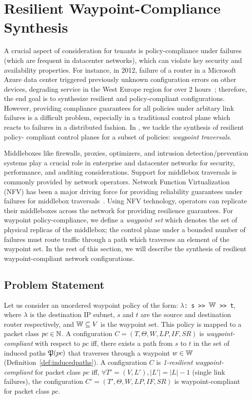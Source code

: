 \section{Resilient Waypoint-Compliance Synthesis}
A crucial aspect of consideration for tenants is 
policy-compliance under failures (which are frequent in 
datacenter networks), which can violate key security
and availability properties. 
For instance, in 2012,
failure of a router in a Microsoft Azure data center 
triggered previously unknown configuration errors on other 
devices, degrading service 
in the West Europe region for over 2
hours~\cite{azure}; therefore, the end goal is 
to synthesize resilient and policy-compliant 
configurations. 
However, providing compliance 
guarantees for all policies
under arbitary link failures is a difficult problem, 
especially in a traditional control plane 
which reacts to failures in a distributed fashion. 
In \name, we tackle the synthesis of resilient policy-
compliant control planes for a subset of policies: 
\emph{waypoint traversals}.

Middleboxes like firewalls,
proxies, optimizers, and intrusion detection/prevention 
systems 
 play a crucial role in enterprise and
datacenter networks for security, performance,  
and auditing considerations. Support for  
middlebox traversals is commonly 
provided by network operators.
Network Function Virtualization (NFV) has been a 
major driving force for providing reliability 
guarantees under failures  
for middlebox traversals~\cite{opennf, netbricks}. 
Using NFV technology, operators can replicate 
their middleboxes across the network for providing 
resilience guarantees. For waypoint policy-compliance, 
we define a \emph{waypoint set} 
which denotes the set of physical replicas of the 
middlebox; the control plane under a bounded 
number of failures must route traffic through a 
path which traverses an element of the waypoint
set. In the rest of this section, 
we will describe the synthesis of resilient 
waypoint-compliant network configurations. 

\subsection{Problem Statement}
Let us consider an 
unordered waypoint policy of the form: 
\texttt{$\lambda$: s >> $\mathbb{W}$ >> t},
where $\lambda$ is the destination IP subnet,  
$s$ and $t$ are the source and destination router respectively, 
and $\mathbb{W} \subseteq V$ is the waypoint set. This
policy is mapped to a packet class $pc \in \mathbb{N}$. 
A configuration $C=(T,\Theta,W,LP,IF,SR)$ is 
\emph{waypoint-compliant} with respect to $pc$ 
iff, there exists a path from $s$ to $t$ in the 
set of induced paths $\mathfrak{P}(pc)$ that traverses
through a waypoint $w \in \mathbb{W}$
(Definition~\ref{def:inducedpaths}). 
A configuration $C$ is 
\emph{1-resilient waypoint-compliant} 
for packet class $pc$  
iff,   
$\forall T' = (V, L'), |L'| = |L| - 1$ (single link failures), 
the configuration $C'
=(T',\Theta,W,LP,IF,SR)$  
is waypoint-compliant for packet class $pc$. 

